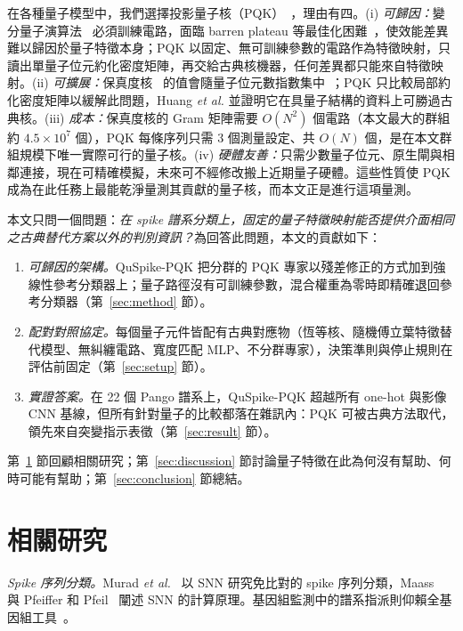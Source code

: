 \documentclass[10pt,a4paper]{article}
\begin{document}
在各種量子模型中，我們選擇投影量子核（PQK）~\cite{huang2021power}，理由有四。(i) \emph{可歸因：}變分量子演算法~\cite{cerezo2021vqa} 必須訓練電路，面臨 barren plateau 等最佳化困難~\cite{mcclean2018barren}，使效能差異難以歸因於量子特徵本身；PQK 以固定、無可訓練參數的電路作為特徵映射，只讀出單量子位元約化密度矩陣，再交給古典核機器，任何差異都只能來自特徵映射。(ii) \emph{可擴展：}保真度核~\cite{havlicek2019} 的值會隨量子位元數指數集中~\cite{thanasilp2024concentration}；PQK 只比較局部約化密度矩陣以緩解此問題，Huang \textit{et al.} 並證明它在具量子結構的資料上可勝過古典核。(iii) \emph{成本：}保真度核的 Gram 矩陣需要 $O(N^2)$ 個電路（本文最大的群組約 $4.5\times10^7$ 個），PQK 每條序列只需 3 個測量設定、共 $O(N)$ 個，是在本文群組規模下唯一實際可行的量子核。(iv) \emph{硬體友善：}只需少數量子位元、原生閘與相鄰連接，現在可精確模擬，未來可不經修改搬上近期量子硬體。這些性質使 PQK 成為在此任務上最能乾淨量測其貢獻的量子核，而本文正是進行這項量測。

本文只問一個問題：\emph{在 spike 譜系分類上，固定的量子特徵映射能否提供介面相同之古典替代方案以外的判別資訊？}為回答此問題，本文的貢獻如下：
\begin{enumerate}
    \item \textit{可歸因的架構。}QuSpike-PQK 把分群的 PQK 專家以殘差修正的方式加到強線性參考分類器上；量子路徑沒有可訓練參數，混合權重為零時即精確退回參考分類器（第~\ref{sec:method} 節）。
    \item \textit{配對對照協定。}每個量子元件皆配有古典對應物（恆等核、隨機傅立葉特徵替代模型、無糾纏電路、寬度匹配 MLP、不分群專家），決策準則與停止規則在評估前固定（第~\ref{sec:setup} 節）。
    \item \textit{實證答案。}在 22 個 Pango 譜系上，QuSpike-PQK 超越所有 one-hot 與影像 CNN 基線，但所有針對量子的比較都落在雜訊內：PQK 可被古典方法取代，領先來自突變指示表徵（第~\ref{sec:result} 節）。
\end{enumerate}
第~\ref{sec:related-work} 節回顧相關研究；第~\ref{sec:discussion} 節討論量子特徵在此為何沒有幫助、何時可能有幫助；第~\ref{sec:conclusion} 節總結。

\section{相關研究}
\label{sec:related-work}

\textit{Spike 序列分類。}Murad \textit{et al.}~\cite{murad2024snn} 以 SNN 研究免比對的 spike 序列分類，Maass~\cite{maass1997} 與 Pfeiffer 和 Pfeil~\cite{pfeiffer2018} 闡述 SNN 的計算原理。基因組監測中的譜系指派則仰賴全基因組工具~\cite{rambaut2020pango,otoole2021pangolin,turakhia2021usher,aksamentov2021nextclade}。
\end{document}
